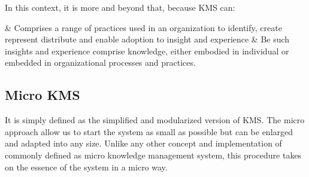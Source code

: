 In this context, it is more and beyond that, because \ac{KMS} can:

\begin{easylist}
& Comprises a range of practices used in an organization to identify, create represent distribute and enable adoption to insight and experience
& Be such insights and experience comprise knowledge, either embodied in individual or embedded in organizational processes and practices.
\end{easylist}

\subsection{Micro {KMS}}

It is simply defined as the simplified and modularized version of \ac{KMS}.
The micro approach allow us to start the system as small as possible but can be enlarged and adapted into any size. Unlike any other concept and implementation of commonly defined as micro knowledge management system, this procedure takes on the essence of the system in a micro way.

